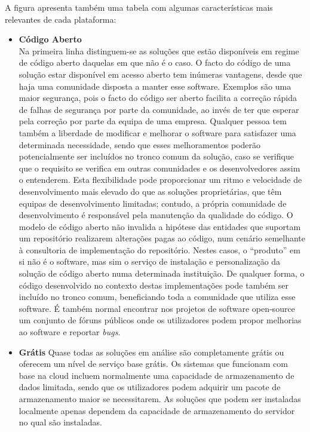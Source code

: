 \documentclass[sigconf,nonacm]{acmart}
\begin{document}
A figura apresenta também uma tabela com algumas características mais relevantes de cada plataforma:

\begin{itemize}
	\item \textbf{Código Aberto}\\
	Na primeira linha distinguem-se as soluções que estão disponíveis em regime de código aberto daquelas em que não é o caso. O facto do código de uma solução estar disponível em acesso aberto tem inúmeras vantagens, desde que haja uma comunidade disposta a manter esse software. Exemplos são uma maior segurança, pois o facto do código ser aberto facilita a correção rápida de falhas de segurança por parte da comunidade, ao invés de ter que esperar pela correção por parte da equipa de uma empresa. Qualquer pessoa tem também a liberdade de modificar e melhorar o software para satisfazer uma determinada necessidade, sendo que esses melhoramentos poderão potencialmente ser incluídos no tronco comum da solução, caso se verifique que o requisito se verifica em outras comunidades e os desenvolvedores assim o entenderem. Esta flexibilidade pode proporcionar um ritmo e velocidade de desenvolvimento mais elevado do que as soluções proprietárias, que têm equipas de desenvolvimento limitadas; contudo, a própria comunidade de desenvolvimento é responsável pela manutenção da qualidade do código. O modelo de código aberto não invalida a hipótese das entidades que suportam um repositório realizarem alterações pagas ao código, num cenário semelhante à consultoria de implementação do repositório. Nestes casos, o ``produto'' em si não é o software, mas sim o serviço de instalação e personalização da solução de código aberto numa determinada instituição. De qualquer forma, o código desenvolvido no contexto destas implementações pode também ser incluído no tronco comum, beneficiando toda a comunidade que utiliza esse software. É também normal encontrar nos projetos de software open-source um conjunto de fóruns públicos onde os utilizadores podem propor melhorias ao software e reportar \textit{bugs}.
	\item \textbf{Grátis} 
	Quase todas as soluções em análise são completamente grátis ou oferecem um nível de serviço base grátis. Os sistemas que funcionam com base na cloud incluem normalmente uma capacidade de armazenamento de dados limitada, sendo que os utilizadores podem adquirir um pacote de armazenamento maior se necessitarem. As soluções que podem ser instaladas localmente apenas dependem da capacidade de armazenamento do servidor no qual são instaladas.

\end{itemize}
\end{document}
